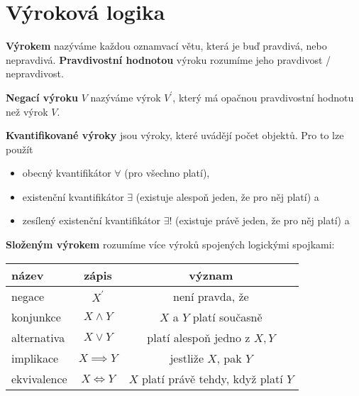 \section{Výroková logika}
\begin{definition}
  \textbf{Výrokem} nazýváme každou oznamvací větu, která je buď pravdivá, nebo nepravdivá. \textbf{Pravdivostní hodnotou} výroku rozumíme jeho pravdivost / nepravdivost.
\end{definition}

\begin{definition}
  \textbf{Negací výroku} $V$ nazýváme výrok $V^\prime$, který má opačnou pravdivostní hodnotu než výrok $V$.
\end{definition}

\begin{pozn}
  \textbf{Kvantifikované výroky} jsou výroky, které uvádějí počet objektů. Pro to lze použít
  \begin{itemize}
    \item obecný kvantifikátor $\forall$ (pro všechno platí),
    \item existenční kvantifikátor $\exists$ (existuje alespoň jeden, že pro něj platí) a
    \item zesílený existenční kvantifikátor $\exists !$ (existuje právě jeden, že pro něj platí) a
  \end{itemize}
\end{pozn}

\begin{definition}
  \textbf{Složeným výrokem} rozumíme více výroků spojených logickými spojkami:
  \begin{center}
    \begin{tabular}{l | c c}
      název & zápis & význam \\
      \hline
      negace & $X^\prime$ & není pravda, že \\
      konjunkce & $X\land Y$ & $X$ a $Y$ platí současně \\
      alternativa & $X\lor Y$ & platí alespoň jedno z $X,Y$\\
      implikace & $X\implies Y$ & jestliže $X$, pak $Y$\\
      ekvivalence & $X\iff Y$ & $X$ platí právě tehdy, když platí $Y$
    \end{tabular}
  \end{center}
\end{definition}


